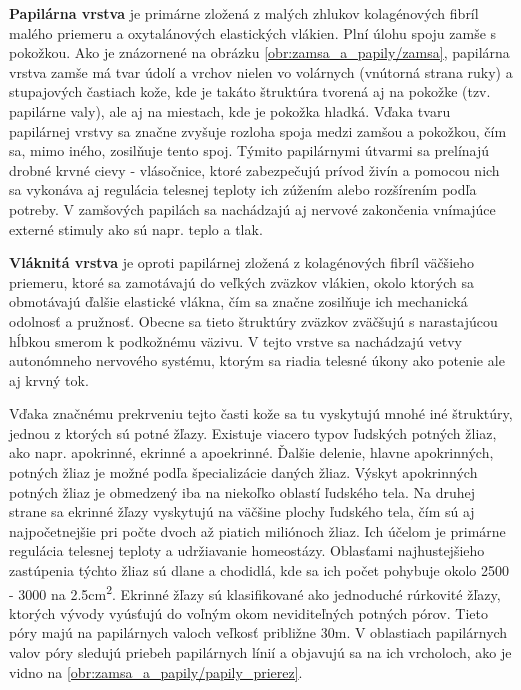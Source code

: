   \textbf{Papilárna vrstva} je primárne zložená z malých zhlukov kolagénových fibríl malého priemeru a oxytalánových elastických vlákien.
  Plní úlohu spoju zamše s pokožkou. Ako je znázornené na obrázku \ref{obr:zamsa_a_papily/zamsa}, papilárna vrstva zamše má tvar údolí a vrchov
  nielen vo volárnych (vnútorná strana ruky) a stupajových častiach kože, kde je takáto štruktúra tvorená aj na pokožke (tzv. papilárne valy), ale aj na miestach,
  kde je pokožka hladká. Vďaka tvaru papilárnej vrstvy sa značne zvyšuje rozloha spoja medzi zamšou a pokožkou, čím sa, mimo iného, zosilňuje tento spoj.
  Týmito papilárnymi útvarmi sa prelínajú drobné krvné cievy - vlásočnice, ktoré zabezpečujú prívod živín a pomocou nich sa vykonáva aj regulácia telesnej
  teploty ich zúžením alebo rozšírením podľa potreby. V zamšových papilách sa nachádzajú aj nervové zakončenia vnímajúce externé stimuly ako sú napr. teplo a tlak. 

  \textbf{Vláknitá vrstva} je oproti papilárnej zložená z kolagénových fibríl väčšieho priemeru, ktoré sa zamotávajú do veľkých zväzkov vlákien,
  okolo ktorých sa obmotávajú ďalšie elastické vlákna, čím sa značne zosilňuje ich mechanická odolnosť a pružnosť. Obecne sa tieto štruktúry zväzkov zväčšujú
  s narastajúcou hĺbkou smerom k podkožnému väzivu. V tejto vrstve sa nachádzajú vetvy autonómneho nervového systému, ktorým sa riadia telesné úkony ako potenie
  ale aj krvný tok.

  Vďaka značnému prekrveniu tejto časti kože sa tu vyskytujú mnohé iné štruktúry, jednou z ktorých sú potné žľazy. Existuje viacero typov ľudských
  potných žliaz, ako napr. apokrinné, ekrinné a apoekrinné. Ďalšie delenie, hlavne apokrinných, potných žliaz je možné podľa špecializácie daných žliaz.
  Výskyt apokrinných potných žliaz je obmedzený iba na niekoľko oblastí ľudského tela. Na druhej strane sa ekrinné žľazy vyskytujú na väčšine plochy
  ľudského tela, čím sú aj najpočetnejšie pri počte dvoch až piatich miliónoch žliaz. Ich účelom je primárne regulácia telesnej teploty a udržiavanie homeostázy.
  Oblasťami najhustejšieho zastúpenia týchto žliaz sú dlane a chodidlá, kde sa ich počet pohybuje okolo 2500 - 3000 na 2.5cm\textsuperscript{2}.
  Ekrinné žľazy sú klasifikované ako jednoduché rúrkovité žľazy, ktorých vývody vyúsťujú do voľným okom neviditeľných potných pórov. Tieto póry majú
  na papilárnych valoch veľkosť približne 30\textmugreek{}m. V oblastiach papilárnych valov póry sledujú priebeh papilárnych línií a objavujú sa na ich vrcholoch,
  ako je vidno na \ref{obr:zamsa_a_papily/papily_prierez}.
  
